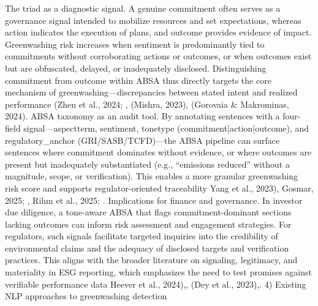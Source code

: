 The triad as a diagnostic signal. A genuine commitment often serves as a governance signal intended to mobilize resources and set expectations, whereas action indicates the execution of plans, and outcome provides evidence of impact. Greenwashing risk increases when sentiment is predominantly tied to commitments without corroborating actions or outcomes, or when outcomes exist but are obfuscated, delayed, or inadequately disclosed. Distinguishing commitment from outcome within ABSA thus directly targets the core mechanism of greenwashing—discrepancies between stated intent and realized performance (Zhen et al., 2024; , (Mishra, 2023), (Gorovaia & Makrominas, 2024).
ABSA taxonomy as an audit tool. By annotating sentences with a four-field signal—aspectterm, sentiment, tonetype (commitment|action|outcome), and regulatory_anchor (GRI/SASB/TCFD)—the ABSA pipeline can surface sentences where commitment dominates without evidence, or where outcomes are present but inadequately substantiated (e.g., “emissions reduced” without a magnitude, scope, or verification). This enables a more granular greenwashing risk score and supports regulator-oriented traceability Yang et al., 2023), Gosmar, 2025; , Rihm et al., 2025; .
Implications for finance and governance. In investor due diligence, a tone-aware ABSA that flags commitment-dominant sections lacking outcomes can inform risk assessment and engagement strategies. For regulators, such signals facilitate targeted inquiries into the credibility of environmental claims and the adequacy of disclosed targets and verification practices. This aligns with the broader literature on signaling, legitimacy, and materiality in ESG reporting, which emphasizes the need to test promises against verifiable performance data Heever et al., 2024),, (Dey et al., 2023),.
4) Existing NLP approaches to greenwashing detection

